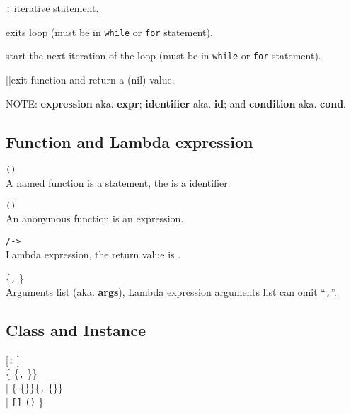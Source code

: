 \hangpar {}  

\hangpar {}   

\hangpar {}  \texttt{:}   \quad iterative statement.

\hangpar {}\quad exits loop (must be in \texttt{while} or \texttt{for} statement).

\hangpar {}\quad start the next iteration of the loop (must be in \texttt{while} or \texttt{for} statement).

\hangpar {} []\quad exit function and return a (nil) value.

\hangpar \textsf{NOTE}: \textbf{expression} aka. \textbf{expr}; \textbf{identifier} aka. \textbf{id}; and \textbf{condition} aka. \textbf{cond}.

\subsection*{Function and Lambda expression}

\hangpar {}  \texttt{(}\texttt{)}   \\
A named function is a statement, the  is a identifier.

\hangpar {} \texttt{(}\texttt{)}   \\
An anonymous function is an expression.

\hangpar \texttt{/}\texttt{->} \\
Lambda expression, the return value is .

\hangpar {} \{\texttt{,} \}\\
Arguments list (aka. \textbf{args}), Lambda expression arguments list can omit ``\texttt{,}''.

\subsection*{Class and Instance}
\hangpar {}  [\texttt{:} ]\\
\{ \{\texttt{,} \}\}\\
    | \{ \{\texttb{=}\}\}\{\texttt{,} \{\texttb{=}\}\}\\
    | \hangpar \texttt{[}\texttt{]}   \texttt{(}\texttt{)}  \}

